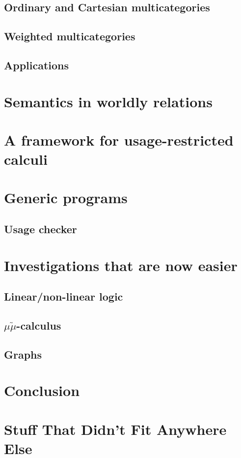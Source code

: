 \documentclass[a4paper,oneside,11pt]{book}
\theoremstyle{definition}
\begin{document}
  \section{Ordinary and Cartesian multicategories}
  
  \section{Weighted multicategories}
  
  \section{Applications}

\chapter{Semantics in worldly relations}\label{sec:wrel}

\chapter{A framework for usage-restricted calculi}
  

\chapter{Generic programs}
  \section{Usage checker}

\chapter{Investigations that are now easier}
  \section{Linear/non-linear logic}
  
  \section{$\mu\tilde\mu$-calculus}
  \section{Graphs}

\chapter{Conclusion}



\appendix
\chapter{Stuff That Didn't Fit Anywhere Else}




\end{document}
